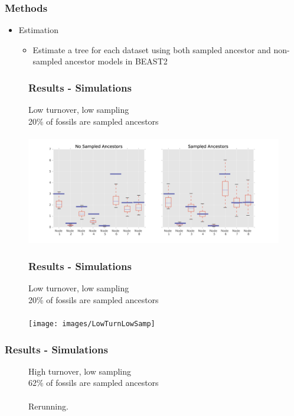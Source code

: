 \documentclass[]{beamer}
\begin{document}
\begin{frame}
\frametitle{Methods}
\begin{itemize}
\item Estimation
\begin{itemize}
\item Estimate a tree for each dataset using both sampled ancestor and non-sampled ancestor models in BEAST2
\end{itemize}
\end{itemize}
\end{frame}

\begin{frame}
\begin{center}
\begin{figure}
\frametitle{Results -  Simulations}
Low turnover, low sampling  \\
20\% of fossils are sampled ancestors \\
\boldsymbol{\lambda} \mu \psi   \rho \\
\includegraphics[scale=0.4]{images/LowTurnLowSampnodes}
\end{figure}
\end{center}
\end{frame}

\begin{frame}
\begin{center}
\begin{figure}
\frametitle{Results -  Simulations}
Low turnover, low sampling  \\
20\% of fossils are sampled ancestors \\
\boldsymbol{\lambda} \mu \psi   \rho \\
\texttt{[image: images/LowTurnLowSamp]}
\end{figure}
\end{center}
\end{frame}


\begin{frame}
\frametitle{Results -  Simulations}
\begin{center}
\begin{figure}
High turnover, low sampling  \\
62\% of fossils are sampled ancestors \\
\mathlarger{\mathlarger{\lambda}} \mu   \psi   \rho \\
Rerunning.
\end{figure}
\end{center}
\end{frame}
\end{document}
